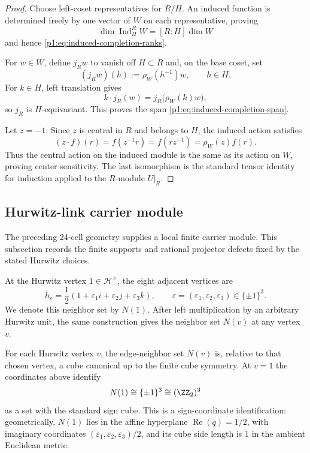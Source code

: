 \documentclass[11pt]{article}
\begin{document}
\begin{proof}
Choose left-coset representatives for \(R/H\).  An induced function is
determined freely by one vector of \(W\) on each representative, proving
\[
    \dim\operatorname{Ind}_H^R W=[R:H]\dim W
\]
and hence \eqref{p1:eq:induced-completion-ranks}.

For \(w\in W\), define \(j_Rw\) to vanish off \(H\subset R\) and, on the base
coset, set
\[
    (j_Rw)(h):=\rho_W(h^{-1})w,
    \qquad h\in H.
\]
For \(k\in H\), left translation gives
\[
    k\cdot j_R(w)=j_R\bigl(\rho_W(k)w\bigr),
\]
so \(j_R\) is \(H\)-equivariant.  This proves the span
\eqref{p1:eq:induced-completion-span}.

Let \(z=-1\).  Since \(z\) is central in \(R\) and belongs to \(H\), the
induced action satisfies
\[
    (z\cdot f)(r)
    =f(z^{-1}r)
    =f(rz^{-1})
    =\rho_W(z)f(r).
\]
Thus the central action on the induced module is the same as its action on
\(W\), proving center sensitivity.  The last isomorphism is the standard
tensor identity for induction applied to the \(R\)-module \(U|_R\).
\end{proof}

\subsection{Hurwitz-link carrier module}
\label{p1:sec:hurwitz-link-carrier}

The preceding 24-cell geometry supplies a local finite carrier module.  This
subsection records the finite supports and rational projector defects fixed by
the stated Hurwitz choices.

\begin{definition}
\label{p1:def:hurwitz-cube-link}
At the Hurwitz vertex \(1\in\mathcal H^\times\), the eight adjacent vertices are
\[
    h_\varepsilon
    =\frac12(1+\varepsilon_1 i+\varepsilon_2 j+\varepsilon_3 k),
    \qquad
    \varepsilon=(\varepsilon_1,\varepsilon_2,\varepsilon_3)\in\{\pm1\}^3.
\]
We denote this neighbor set by \(N(1)\).  After left multiplication by an
arbitrary Hurwitz unit, the same construction gives the neighbor set \(N(v)\) at
any vertex \(v\).
\end{definition}

\begin{proposition}
\label{p1:prop:hurwitz-link-cube}
For each Hurwitz vertex \(v\), the edge-neighbor set \(N(v)\) is, relative to that chosen vertex, a
cube canonical up to the finite cube symmetry.  At \(v=1\) the coordinates above identify
\[
    N(1)\cong\{\pm1\}^3\cong(\ZZ_2)^3
\]
as a set with the standard sign cube. This is a sign-coordinate identification: geometrically, $N(1)$ lies in the affine hyperplane $\operatorname{Re}(q)=1/2$, with imaginary coordinates $(\varepsilon_1,\varepsilon_2,\varepsilon_3)/2$, and its cube side length is $1$ in the ambient Euclidean metric.
\end{proposition}
\end{document}
